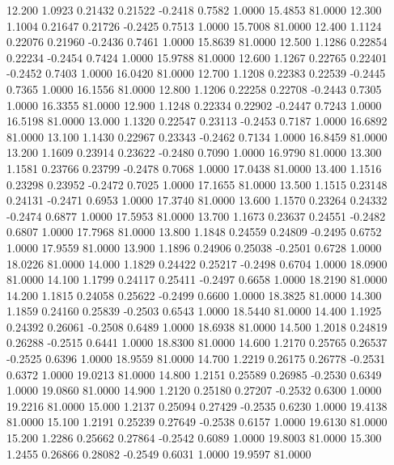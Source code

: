   12.200   1.0923   0.21432   0.21522  -0.2418   0.7582   1.0000  15.4853  81.0000
  12.300   1.1004   0.21647   0.21726  -0.2425   0.7513   1.0000  15.7008  81.0000
  12.400   1.1124   0.22076   0.21960  -0.2436   0.7461   1.0000  15.8639  81.0000
  12.500   1.1286   0.22854   0.22234  -0.2454   0.7424   1.0000  15.9788  81.0000
  12.600   1.1267   0.22765   0.22401  -0.2452   0.7403   1.0000  16.0420  81.0000
  12.700   1.1208   0.22383   0.22539  -0.2445   0.7365   1.0000  16.1556  81.0000
  12.800   1.1206   0.22258   0.22708  -0.2443   0.7305   1.0000  16.3355  81.0000
  12.900   1.1248   0.22334   0.22902  -0.2447   0.7243   1.0000  16.5198  81.0000
  13.000   1.1320   0.22547   0.23113  -0.2453   0.7187   1.0000  16.6892  81.0000
  13.100   1.1430   0.22967   0.23343  -0.2462   0.7134   1.0000  16.8459  81.0000
  13.200   1.1609   0.23914   0.23622  -0.2480   0.7090   1.0000  16.9790  81.0000
  13.300   1.1581   0.23766   0.23799  -0.2478   0.7068   1.0000  17.0438  81.0000
  13.400   1.1516   0.23298   0.23952  -0.2472   0.7025   1.0000  17.1655  81.0000
  13.500   1.1515   0.23148   0.24131  -0.2471   0.6953   1.0000  17.3740  81.0000
  13.600   1.1570   0.23264   0.24332  -0.2474   0.6877   1.0000  17.5953  81.0000
  13.700   1.1673   0.23637   0.24551  -0.2482   0.6807   1.0000  17.7968  81.0000
  13.800   1.1848   0.24559   0.24809  -0.2495   0.6752   1.0000  17.9559  81.0000
  13.900   1.1896   0.24906   0.25038  -0.2501   0.6728   1.0000  18.0226  81.0000
  14.000   1.1829   0.24422   0.25217  -0.2498   0.6704   1.0000  18.0900  81.0000
  14.100   1.1799   0.24117   0.25411  -0.2497   0.6658   1.0000  18.2190  81.0000
  14.200   1.1815   0.24058   0.25622  -0.2499   0.6600   1.0000  18.3825  81.0000
  14.300   1.1859   0.24160   0.25839  -0.2503   0.6543   1.0000  18.5440  81.0000
  14.400   1.1925   0.24392   0.26061  -0.2508   0.6489   1.0000  18.6938  81.0000
  14.500   1.2018   0.24819   0.26288  -0.2515   0.6441   1.0000  18.8300  81.0000
  14.600   1.2170   0.25765   0.26537  -0.2525   0.6396   1.0000  18.9559  81.0000
  14.700   1.2219   0.26175   0.26778  -0.2531   0.6372   1.0000  19.0213  81.0000
  14.800   1.2151   0.25589   0.26985  -0.2530   0.6349   1.0000  19.0860  81.0000
  14.900   1.2120   0.25180   0.27207  -0.2532   0.6300   1.0000  19.2216  81.0000
  15.000   1.2137   0.25094   0.27429  -0.2535   0.6230   1.0000  19.4138  81.0000
  15.100   1.2191   0.25239   0.27649  -0.2538   0.6157   1.0000  19.6130  81.0000
  15.200   1.2286   0.25662   0.27864  -0.2542   0.6089   1.0000  19.8003  81.0000
  15.300   1.2455   0.26866   0.28082  -0.2549   0.6031   1.0000  19.9597  81.0000
